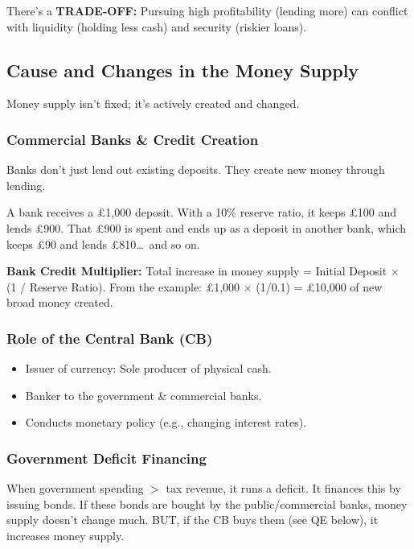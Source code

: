 \documentclass[11pt, a4paper, twoside]{book}
\begin{document}
\begin{coreidea}
There's a \textbf{TRADE-OFF:} Pursuing high profitability (lending more) can conflict with liquidity (holding less cash) and security (riskier loans).
\end{coreidea}

\subsection{Cause and Changes in the Money Supply}

Money supply isn't fixed; it's actively created and changed.

\subsubsection{Commercial Banks \& Credit Creation}

Banks don't just lend out existing deposits. They create new money through lending.

\begin{example}
A bank receives a £1,000 deposit. With a 10\% reserve ratio, it keeps £100 and lends £900. That £900 is spent and ends up as a deposit in another bank, which keeps £90 and lends £810\ldots\ and so on.

\textbf{Bank Credit Multiplier:} Total increase in money supply = Initial Deposit $\times$ (1 / Reserve Ratio). From the example: £1,000 $\times$ (1/0.1) = £10,000 of new broad money created.
\end{example}

\subsubsection{Role of the Central Bank (CB)}

\begin{itemize}
  \item Issuer of currency: Sole producer of physical cash.
  \item Banker to the government \& commercial banks.
  \item Conducts monetary policy (e.g., changing interest rates).
\end{itemize}

\subsubsection{Government Deficit Financing}

When government spending $>$ tax revenue, it runs a deficit. It finances this by issuing bonds. If these bonds are bought by the public/commercial banks, money supply doesn't change much. BUT, if the CB buys them (see QE below), it increases money supply.
\end{document}
